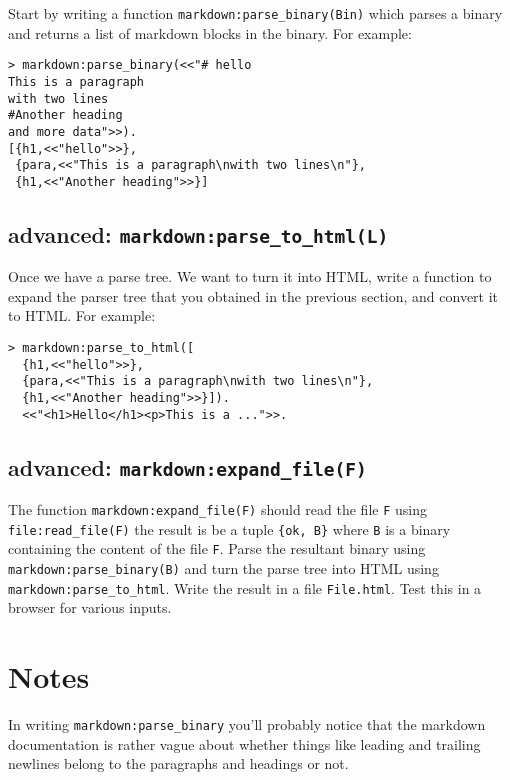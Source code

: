 ﻿\documentclass[12pt]{hitec}
\begin{document}
Start by writing a function \verb+markdown:parse_binary(Bin)+ which
parses a binary and returns a list of markdown blocks in the
binary. For example:

\begin{Verbatim}[frame=single]
> markdown:parse_binary(<<"# hello
This is a paragraph
with two lines
#Another heading
and more data">>).
[{h1,<<"hello">>},
 {para,<<"This is a paragraph\nwith two lines\n"},
 {h1,<<"Another heading">>}]
\end{Verbatim}

\subsection{advanced: \texttt{markdown:parse\_to\_html(L)}}

Once we have a parse tree. We want to turn it into HTML, write a
function to expand the parser tree that you obtained in the previous
section, and convert it to HTML. For example:

\begin{Verbatim}[frame=single]
> markdown:parse_to_html([
  {h1,<<"hello">>},
  {para,<<"This is a paragraph\nwith two lines\n"},
  {h1,<<"Another heading">>}]).
  <<"<h1>Hello</h1><p>This is a ...">>.
\end{Verbatim}

\subsection{advanced: \texttt{markdown:expand\_file(F)}}

The function \verb+markdown:expand_file(F)+ should read the file
\verb+F+ using\\
\verb+file:read_file(F)+ the result is be a tuple
\verb+{ok, B}+ where \verb+B+ is a binary containing the content of
the file \verb+F+. Parse the resultant binary using
\verb+markdown:parse_binary(B)+ and turn the parse tree into HTML using
\verb+markdown:parse_to_html+. Write the result in a file
\verb+File.html+. Test this in a browser for various inputs.

\section{Notes}

In writing \verb+markdown:parse_binary+ you'll probably notice that the
markdown documentation is rather vague about whether things like leading
and trailing newlines belong to the paragraphs and headings or not.
\end{document}
